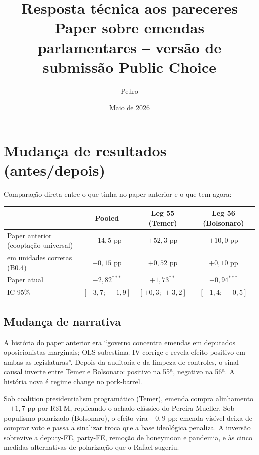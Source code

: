 \documentclass[11pt,a4paper]{article}
\title{Resposta técnica aos pareceres\\
{\large Paper sobre emendas parlamentares -- versão de submissão Public Choice}}
\author{Pedro}
\date{Maio de 2026}
\begin{document}
\maketitle

\section*{Mudança de resultados (antes/depois)}

Comparação direta entre o que tinha no paper anterior e o que tem agora:

\begin{table}[h]
\centering
\small
\begin{tabular}{lccc}
\toprule
& Pooled & Leg 55 (Temer) & Leg 56 (Bolsonaro) \\
\midrule
Paper anterior (cooptação universal) & $+14{,}5$ pp & $+52{,}3$ pp & $+10{,}0$ pp \\
\quad em unidades corretas (B0.4) & $+0{,}15$ pp & $+0{,}52$ pp & $+0{,}10$ pp \\
\midrule
Paper atual & $-2{,}82^{***}$ & $+1{,}73^{**}$ & $-0{,}94^{***}$ \\
\quad IC 95\% & $[-3{,}7;\,-1{,}9]$ & $[+0{,}3;\,+3{,}2]$ & $[-1{,}4;\,-0{,}5]$ \\
\bottomrule
\end{tabular}
\end{table}

\subsection*{Mudança de narrativa}

A história do paper anterior era ``governo concentra emendas em deputados oposicionistas marginais; OLS subestima; IV corrige e revela efeito positivo em ambas as legislaturas''. Depois da auditoria e da limpeza de controles, o sinal causal inverte entre Temer e Bolsonaro: positivo na 55ª, negativo na 56ª. A história nova é regime change no pork-barrel.

Sob coalition presidentialism programático (Temer), emenda compra alinhamento -- $+1{,}7$ pp por R\$1\,M, replicando o achado clássico do Pereira-Mueller. Sob populismo polarizado (Bolsonaro), o efeito vira $-0{,}9$ pp: emenda visível deixa de comprar voto e passa a sinalizar troca que a base ideológica penaliza. A inversão sobrevive a deputy-FE, party-FE, remoção de honeymoon e pandemia, e às cinco medidas alternativas de polarização que o Rafael sugeriu.
\end{document}
